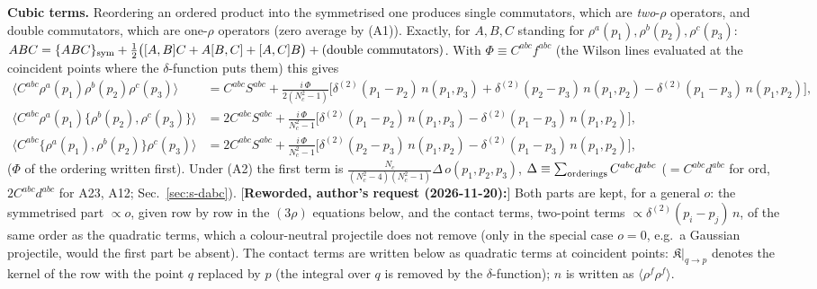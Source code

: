 \documentclass[9pt]{article}
\numberwithin{equation}{section}
\begin{document}
{\noindent\textbf{Cubic terms.} Reordering an ordered product into the symmetrised one produces single commutators, which are \emph{two}-$\rho$ operators, and double commutators, which are one-$\rho$ operators (zero average by (A1)). Exactly, for $A,B,C$ standing for $\rho^{a}(p_{1}),\rho^{b}(p_{2}),\rho^{c}(p_{3})$: $ABC=\{ABC\}_{\rm sym}+\frac12\big([A,B]C+A[B,C]+[A,C]B\big)+(\text{double commutators})$. With $\Phi\equiv C^{abc}f^{abc}$ (the Wilson lines evaluated at the coincident points where the $\delta$-function puts them) this gives
\begin{align}
\langle C^{abc}\rho^{a}(p_{1})\rho^{b}(p_{2})\rho^{c}(p_{3})\rangle&=C^{abc}S^{abc}+\frac{i\,\Phi}{2(N_{c}^{2}-1)}\Big[\delta^{(2)}(p_{1}-p_{2})\,n(p_{1},p_{3})+\delta^{(2)}(p_{2}-p_{3})\,n(p_{1},p_{2})-\delta^{(2)}(p_{1}-p_{3})\,n(p_{1},p_{2})\Big],\label{eq:s-ord}\\
\langle C^{abc}\rho^{a}(p_{1})\{\rho^{b}(p_{2}),\rho^{c}(p_{3})\}\rangle&=2C^{abc}S^{abc}+\frac{i\,\Phi}{N_{c}^{2}-1}\Big[\delta^{(2)}(p_{1}-p_{2})\,n(p_{1},p_{3})-\delta^{(2)}(p_{1}-p_{3})\,n(p_{1},p_{2})\Big],\label{eq:s-a23}\\
\langle C^{abc}\{\rho^{a}(p_{1}),\rho^{b}(p_{2})\}\rho^{c}(p_{3})\rangle&=2C^{abc}S^{abc}+\frac{i\,\Phi}{N_{c}^{2}-1}\Big[\delta^{(2)}(p_{2}-p_{3})\,n(p_{1},p_{2})-\delta^{(2)}(p_{1}-p_{3})\,n(p_{1},p_{2})\Big],\label{eq:s-a12}
\end{align}
($\Phi$ of the ordering written first). Under (A2) the first term is $\frac{N_{c}}{(N_{c}^{2}-4)(N_{c}^{2}-1)}\Delta\,o(p_{1},p_{2},p_{3})$, $\Delta\equiv\sum_{\rm orderings}C^{abc}d^{abc}$ ($=C^{abc}d^{abc}$ for ord, $2C^{abc}d^{abc}$ for A23, A12; Sec.~\ref{sec:s-dabc}). [\textbf{Reworded, author's request (2026-11-20):}] Both parts are kept, for a general $o$: the symmetrised part $\propto o$, given row by row in the $(3\rho)$ equations below, and the contact terms, two-point terms $\propto\delta^{(2)}(p_{i}-p_{j})\,n$, of the same order as the quadratic terms, which a colour-neutral projectile does not remove (only in the special case $o=0$, e.g.\ a Gaussian projectile, would the first part be absent). The contact terms are written below as quadratic terms at coincident points: $\mathfrak{K}\big|_{q\to p}$ denotes the kernel of the row with the point $q$ replaced by $p$ (the integral over $q$ is removed by the $\delta$-function); $n$ is written as $\langle\rho^{f}\rho^{f}\rangle$.

}
\end{document}
